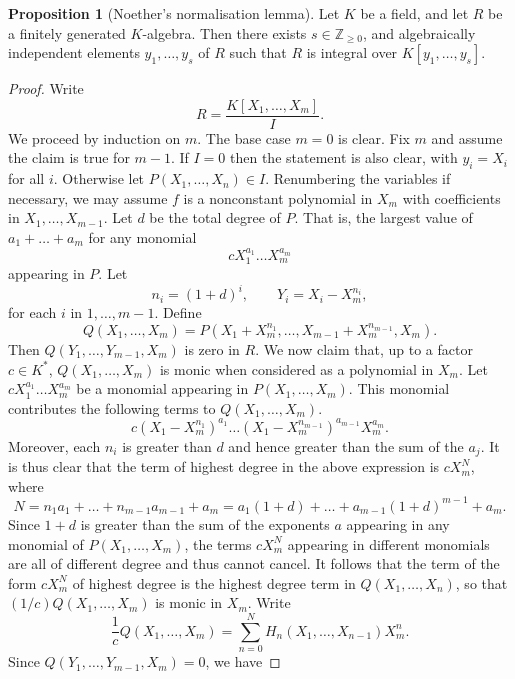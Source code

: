 \documentclass{article}
\newcommand{\Z}{\mathbb{Z}}
\newcommand{\rb}[1]{\left( #1 \right)}
\renewcommand{\sb}[1]{\left[ #1 \right]}
\theoremstyle{definition}\newtheorem{definition}{Definition}[subsection]
\theoremstyle{definition}\newtheorem{remark}[definition]{Remark}
\theoremstyle{definition}\newtheorem*{example}{Example}
\theoremstyle{definition}\newtheorem*{note}{Note}
\newtheorem{proposition}[definition]{Proposition}
\begin{document}
\begin{proposition}[Noether's normalisation lemma]
Let $ K $ be a field, and let $ R $ be a finitely generated $ K $-algebra. Then there exists $ s \in \Z_{\ge 0} $, and algebraically independent elements $ y_1, \dots, y_s $ of $ R $ such that $ R $ is integral over $ K\sb{y_1, \dots, y_s} $.
\end{proposition}

\begin{proof}
Write
$$ R = \dfrac{K\sb{X_1, \dots, X_m}}{I}. $$
We proceed by induction on $ m $. The base case $ m = 0 $ is clear. Fix $ m $ and assume the claim is true for $ m - 1 $. If $ I = 0 $ then the statement is also clear, with $ y_i = X_i $ for all $ i $. Otherwise let $ P\rb{X_1, \dots, X_n} \in I $. Renumbering the variables if necessary, we may assume $ f $ is a nonconstant polynomial in $ X_m $ with coefficients in $ X_1, \dots, X_{m - 1} $. Let $ d $ be the total degree of $ P $. That is, the largest value of $ a_1 + \dots + a_m $ for any monomial
$$ cX_1^{a_1} \dots X_m^{a_m} $$
appearing in $ P $. Let
$$ n_i = \rb{1 + d}^i, \qquad Y_i = X_i - X_m^{n_i}, $$
for each $ i $ in $ 1, \dots, m - 1 $. Define
$$ Q\rb{X_1, \dots, X_m} = P\rb{X_1 + X_m^{n_1}, \dots, X_{m - 1} + X_m^{n_{m - 1}}, X_m}. $$
Then $ Q\rb{Y_1, \dots, Y_{m - 1}, X_m} $ is zero in $ R $. We now claim that, up to a factor $ c \in K^* $, $ Q\rb{X_1, \dots, X_m} $ is monic when considered as a polynomial in $ X_m $. Let $ cX_1^{a_1} \dots X_m^{a_m} $ be a monomial appearing in $ P\rb{X_1, \dots, X_m} $. This monomial contributes the following terms to $ Q\rb{X_1, \dots, X_m} $.
$$ c\rb{X_1 - X_m^{n_1}}^{a_1} \dots \rb{X_1 - X_m^{n_{m - 1}}}^{a_{m - 1}}X_m^{a_m}. $$
Moreover, each $ n_i $ is greater than $ d $ and hence greater than the sum of the $ a_j $. It is thus clear that the term of highest degree in the above expression is $ cX_m^N $, where
$$ N = n_1a_1 + \dots + n_{m - 1}a_{m - 1} + a_m = a_1\rb{1 + d} + \dots + a_{m - 1}\rb{1 + d}^{m - 1} + a_m. $$
Since $ 1 + d $ is greater than the sum of the exponents $ a $ appearing in any monomial of $ P\rb{X_1, \dots, X_m} $, the terms $ cX_m^N $ appearing in different monomials are all of different degree and thus cannot cancel. It follows that the term of the form $ cX_m^N $ of highest degree is the highest degree term in $ Q\rb{X_1, \dots, X_n} $, so that $ \rb{1 / c}Q\rb{X_1, \dots, X_m} $ is monic in $ X_m $. Write
$$ \dfrac{1}{c}Q\rb{X_1, \dots, X_m} = \sum_{n = 0}^N H_n\rb{X_1, \dots, X_{n - 1}}X_m^n. $$
Since $ Q\rb{Y_1, \dots, Y_{m - 1}, X_m} = 0 $, we have

\end{proof}
\end{document}
